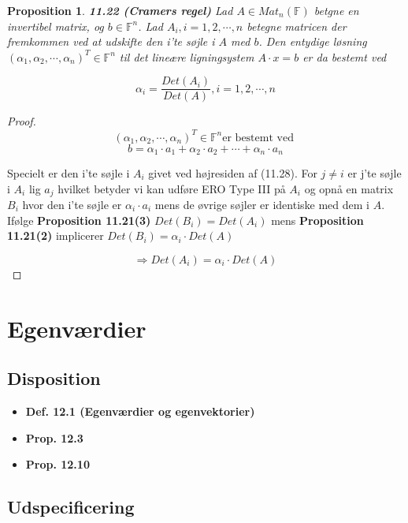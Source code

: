 \documentclass[paper=a4, fontsize=11pt]{scrartcl} %
\newtheorem*{proposition}{Proposition}
\newenvironment{cstmproposition}[1]{\begin{proposition} {\normalfont\textbf{#1}}}{\end{proposition}}
\begin{document}
	\begin{cstmproposition}{11.22 (Cramers regel)}
		Lad $A \in Mat_n(\mathbb{F})$ betgne en invertibel matrix, og $b \in \mathbb{F}^n$. Lad $A_i, i = 1,2,\cdots,n$ betegne matricen der fremkommen ved at udskifte den i'te søjle i $A$ med $b$. Den entydige løsning $(\alpha_1,\alpha_2,\cdots,\alpha_n)^T \in \mathbb{F}^n$ til det lineære ligningsystem $A \cdot x = b$ er da bestemt ved
		
		\[\alpha_i = \frac{Det(A_i)}{Det(A)}, i = 1,2,\cdots,n\]
		
	\end{cstmproposition}
	
	\begin{proof}
		
		\[(\alpha_1,\alpha_2,\cdots,\alpha_n)^T \in \mathbb{F}^n \mbox {er bestemt ved }\]
		\[b = \alpha_1 \cdot a_1 + \alpha_2 \cdot a_2 + \cdots + \alpha_n \cdot a_n \tag{11.28}\]
		
		Specielt er den i'te søjle i $A_i$ givet ved højresiden af (11.28). For $j \not = i$ er j'te søjle i $A_i$ lig $a_j$ hvilket betyder vi kan udføre ERO Type III på $A_i$ og opnå en matrix $B_i$ hvor den i'te søjle er $\alpha_i \cdot a_i$ mens de øvrige søjler er identiske med dem i $A$. Ifølge \textbf{Proposition 11.21(3)} $Det(B_i) = Det(A_i)$ mens \textbf{Proposition 11.21(2)} implicerer $Det(B_i) = \alpha_i \cdot Det(A)$ 
		
		\[\Rightarrow Det(A_i) = \alpha_i \cdot Det(A)\]
		
	\end{proof}
	
	
	
	\newpage
	
	\section{Egenværdier}
	
	\subsection{Disposition}
	
	\begin{itemize}
		\item \textbf{Def. 12.1 (Egenværdier og egenvektorier)}
		\item \textbf{Prop. 12.3}
		\item \textbf{Prop. 12.10}
	\end{itemize}
	
	
	\subsection{Udspecificering}
	
\end{document}
